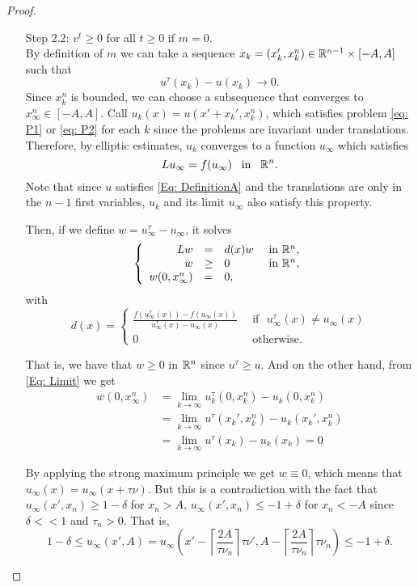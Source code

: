 \begin{proof}
\begin{enumerate}
\item[Step 2.2:] $v^t\geq 0$ for all $t\geq 0$ if $m=0$.\\
By definition of $m$ we can take a sequence $x_k= (x_k',x_k^n) \in \mathbb{R}^{n-1}\times[-A,A]$ such that
\begin{equation}
\label{Eq: Limit}
u^\tau(x_k) - u(x_k) \rightarrow 0.
\end{equation}
Since $x_k^n$ is bounded, we can choose a subsequence that converges to $x_\infty^n \in [-A,A]$.
Call $u_k(x) = u(x'+x_k',x_k^n)$, which satisfies problem \eqref{eq: P1} or \eqref{eq: P2} for each $k$ since the problems are invariant under translations. Therefore, by elliptic estimates, $u_k$ converges to a function $u_\infty$ which satisfies
$$ L u_\infty = f(u_\infty) \,\,\, \text{ in } \,\,\, \mathbb{R}^n. $$
Note that since $u$ satisfies \eqref{Eq: DefinitionA} and the translations are only in the $n-1$ first variables, $u_k$ and its limit $u_\infty$ also satisfy this property. 

Then, if we define $w= u_\infty^\tau - u_\infty$, it solves
$$
\left\{\begin{array}{rcll}
L w &=& d(x) w  &\textrm{ in }\mathbb{R}^n,\\
w &\geq& 0  &\textrm{ in }\mathbb{R}^n,\\
w(0, x_\infty^n ) &=& 0,
\end{array} \right.
$$
with 
$$ d(x) = \begin{cases}
\frac{f(u_\infty^\tau(x))-f(u_\infty(x))}{u_\infty^\tau(x)-u_\infty(x)} \,\,\, &\text{if } \,\, u_\infty^\tau(x)\not=u_\infty(x)\\
0 \,\, & \text{otherwise}.
\end{cases} $$


That is, we have that $w\geq 0$ in $\mathbb{R}^n$ since $u^\tau \geq u$. And on the other hand, from \eqref{Eq: Limit} we get
\begin{align*}
w(0,x_\infty^n) &= \lim_{k\to\infty} u_k^\tau(0,x_k^n)- u_k(0,x_k^n) \\ 
&= \lim_{k\to\infty} u^\tau(x_k',x_k^n)- u_k(x_k',x_k^n) \\ 
&= \lim_{k\to\infty}  u^\tau(x_k)- u_k(x_k) = 0
\end{align*}

By applying the strong maximum principle we get $w\equiv 0$, which means that $u_\infty(x) = u_\infty(x+\tau\nu)$. But this is a contradiction with the fact that $u_\infty(x',x_n) \geq 1-\delta$ for $x_n>A$, $u_\infty(x',x_n) \leq -1+\delta$ for $x_n<-A$ since $\delta<<1$ and $\tau_n>0$. That is,
$$ 1-\delta \leq u_\infty(x',A) = u_\infty \left( x' - \left\lceil \frac{2A}{\tau\nu_n} \right\rceil \tau \nu', A - \left\lceil \frac{2A}{\tau\nu_n} \right\rceil \tau \nu_n\right) \leq -1+\delta. $$


\end{enumerate}
\end{proof}
